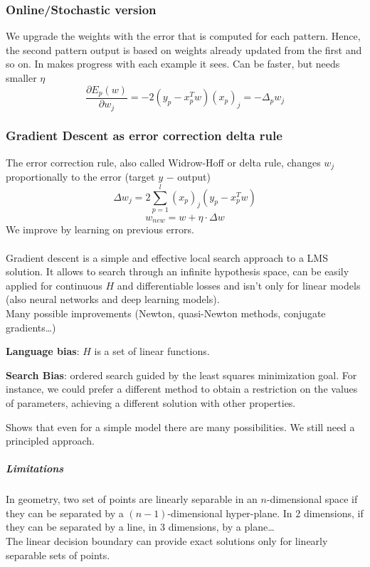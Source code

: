 \documentclass[10pt]{report}
\begin{document}
\subsubsection{Online/Stochastic version} We upgrade the weights with the error that is computed for each pattern. Hence, the second pattern output is based on weights already updated from the first and so on. In makes progress with each example it sees. Can be faster, but needs smaller $\eta$
$$\frac{\partial E_p(w)}{\partial w_j} = -2(y_p - x_p^T w)(x_p)_j = -\Delta_p w_j$$
\subsubsection{Gradient Descent as error correction delta rule} The error correction rule, also called Widrow-Hoff or delta rule, changes $w_j$ proportionally to the error (target $y$ $-$ output)
$$\Delta w_j = 2 \sum_{p=1}^l (x_p)_j (y_p - x_p^T w)$$
$$w_{new} = w + \eta\cdot\Delta w$$
We improve by learning on previous errors.\\\\
Gradient descent is a simple and effective local search approach to a LMS solution. It allows to search through an infinite hypothesis space, can be easily applied for continuous $H$ and differentiable losses and isn't only for linear models (also neural networks and deep learning models).\\
Many possible improvements (Newton, quasi-Newton methods, conjugate gradients\ldots)
\begin{list}{}{}
	\item \textbf{Language bias}: $H$ is a set of linear functions.
	\item \textbf{Search Bias}: ordered search guided by the least squares minimization goal. For instance, we could prefer a different method to obtain a restriction on the values of parameters, achieving a different solution with other properties.
\end{list}
Shows that even for a simple model there are many possibilities. We still need a principled approach.
\subparagraph{Limitations} In geometry, two set of points are linearly separable in an $n$-dimensional space if they can be separated by a $(n-1)$-dimensional hyper-plane. In 2 dimensions, if they can be separated by a line, in 3 dimensions, by a plane\ldots\\
The linear decision boundary can provide exact solutions only for linearly separable sets of points.
\end{document}
